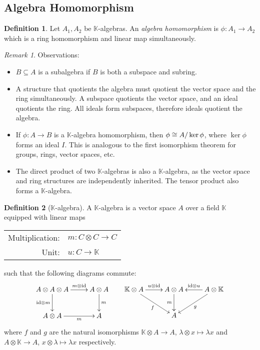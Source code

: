 \documentclass{article}
\theoremstyle{definition}
\newtheorem{Definition}{Definition}
\theoremstyle{remark}
\newtheorem*{Remark*}{Remark}
\theoremstyle{underline}
\theoremstyle{underline}
\let\Im\relax
\DeclareMathOperator{\Im}{Im}
\newcommand{\id}{\mathrm{id}}
\begin{document}
	\subsection{Algebra Homomorphism}
	
	\begin{Definition}
		Let $A_1, A_2$ be $\mathbb K$-algebras. An \emph{algebra homomorphism} is $\phi\colon A_1 \to A_2$ which is a ring homomorphism and linear map simultaneously. 
	\end{Definition}
	
	\begin{Remark*}
		Observations:
		\begin{itemize}
			\item $ B \subseteq A $ is a subalgebra if $B$ is both a subspace and subring. 
			\item A structure that quotients the algebra must quotient the vector space and the ring simultaneously. A subspace quotients the vector space, and an ideal quotients the ring. All ideals form subspaces, therefore ideals quotient the algebra. 
			\item If $\phi \colon A \to B $ is a $\mathbb K$-algebra homomorphism, then $\Im \phi \cong A/\ker \phi$, where $\ker\phi$ forms an ideal $I$. This is analogous to the first isomorphism theorem for groups, rings, vector spaces, etc.
			\item The direct product of two $\mathbb K$-algebras is also a $\mathbb K$-algebra, as the vector space and ring structures are independently inherited. The tensor product also forms a $\mathbb K$-algebra.
		\end{itemize}
	\end{Remark*}
	
	\begin{Definition}[$\mathbb K$-algebra]
		A $\mathbb K$-algebra is a vector space $A$ over a field $\mathbb K$ equipped with linear maps 
		\begin{center}
			\begin{tabular}{rl}
		 		Multiplication: & $m\colon C \otimes C \rightarrow C$ \\
		 		Unit: & $ u \colon C \rightarrow \mathbb K$ 
			\end{tabular}
		\end{center} such that the following diagrams commute:
		\begin{equation*}
		\xymatrix{
			A \otimes A \otimes A \ar[d]_-{\id \otimes m} \ar[r]^-{m \otimes \id} & A \otimes A \ar[d]^-{m} \\
			A \otimes A \ar[r]_-{m} & A
		} \;\;\;\;\;\;
		\xymatrix{
			\mathbb K \otimes A \ar[r]^-{u \otimes \id} \ar[dr]_-{f} & A \otimes A \ar[d]_-{m} & A \otimes \mathbb K \ar[l]_-{\id \otimes u} \ar[dl]^-{g} \\
			& A &	
		}
		\end{equation*}
		where $f$ and $g$ are the natural isomorphisms $\mathbb K \otimes A \to A$, $\lambda \otimes x \mapsto \lambda x$ and $A \otimes \mathbb K \to A$, $x \otimes \lambda \mapsto \lambda x$ respectively.
	\end{Definition}
	
\end{document}
